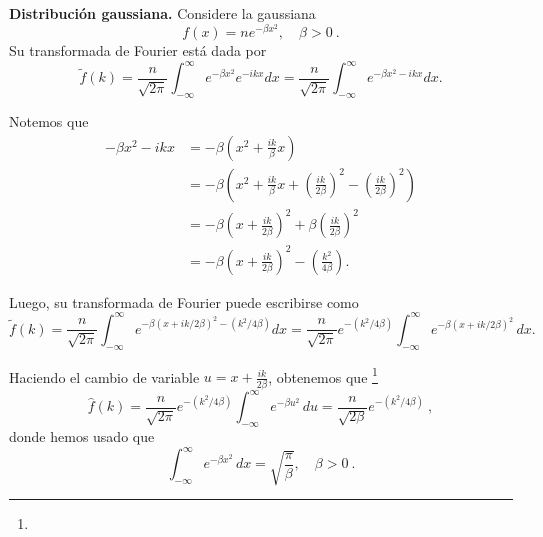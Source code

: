 \begin{ejemplo}
    \textbf{Distribución gaussiana.} Considere la gaussiana
    \begin{equation*}
        f(x) = n e^{-\beta x^2}, \quad  \beta > 0 \ .
    \end{equation*}
    Su transformada de Fourier está dada por 
    \begin{equation*}
        \tilde{f}(k) =  \frac{n}{\sqrt{2\pi}} \int_{-\infty}^{\infty} e^{-\beta x^2} e^{-ikx} dx =  \frac{n}{\sqrt{2\pi}} \int_{-\infty}^{\infty} e^{-\beta x^2-ikx} dx .
    \end{equation*}

    Notemos que 
    \begin{align*}
        -\beta x^2-ikx &= - \beta \left( x^2 + \frac{ik}{\beta}x \right) \\
        &= - \beta \left( x^2 + \frac{ik}{\beta} x + \left( \frac{ik}{2\beta} \right)^2 - \left( \frac{ik}{2\beta} \right)^2 \right) \\
        &= - \beta \left( x + \frac{ik}{2\beta} \right)^2 + \beta \left( \frac{ik}{2\beta} \right)^2 \\
        &= - \beta \left( x + \frac{ik}{2\beta} \right)^2 - \left( \frac{k^2}{4\beta} \right).
    \end{align*}

    Luego, su transformada de Fourier puede escribirse como
    \begin{equation*}
        \tilde{f}(k) =  \frac{n}{\sqrt{2\pi}} \int_{-\infty}^{\infty} e^{-\beta \left( x + ik/2\beta \right)^2 - \left(k^2/4\beta \right)}  dx = \frac{n}{\sqrt{2\pi}} e^{- \left( k^2/4\beta \right)} \int_{-\infty}^{\infty} e^{-\beta \left( x + ik/2\beta \right)^2} \,dx. 
    \end{equation*}

    Haciendo el cambio de variable $u = x + \frac{ik}{2\beta}$, obtenemos que \footnote{}
    \begin{equation}\label{eq:Fourier-Gaussiana}
        \hat{f}(k) = \frac{n}{\sqrt{2\pi}} e^{- \left( k^2/4\beta \right)} \int_{-\infty}^{\infty} e^{-\beta u^2} \, du = \frac{n}{\sqrt{2\beta}} e^{- \left( k^2/4\beta \right)} \ ,
    \end{equation}
    donde hemos usado que 
    \begin{equation}
    \int_{-\infty}^{\infty} e^{-\beta x^2} \,dx = \sqrt{\frac{\pi}{\beta}}, \quad \beta > 0 \ . 
    \end{equation} 


\end{ejemplo}
